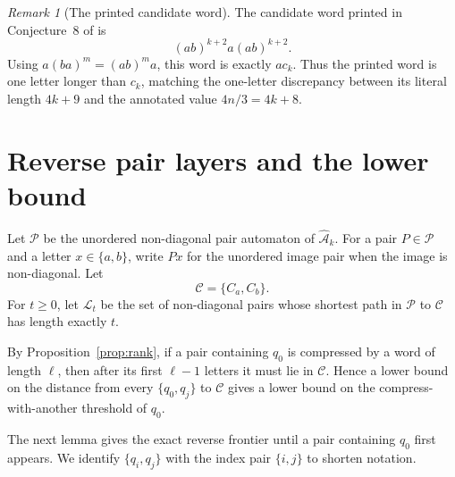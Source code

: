 \documentclass[11pt]{article}
\theoremstyle{definition}
\theoremstyle{remark}
\newtheorem{remark}{Remark}
\newcommand{\Ahat}{\widehat{\mathcal A}}
\newcommand{\pair}[2]{\{q_{#1},q_{#2}\}}
\begin{document}
\begin{remark}[The printed candidate word]
The candidate word printed in Conjecture~8 of \cite{Szykula2026} is
\[
 (ab)^{k+2}a(ab)^{k+2}.
\]
Using $a(ba)^m=(ab)^ma$, this word is exactly $a c_k$. Thus the printed word is one letter longer than $c_k$, matching the one-letter discrepancy between its literal length $4k+9$ and the annotated value $4n/3=4k+8$.
\end{remark}

\section{Reverse pair layers and the lower bound}
Let $\mathcal P$ be the unordered non-diagonal pair automaton of $\Ahat_k$. For a pair $P\in\mathcal P$ and a letter $x\in\{a,b\}$, write $Px$ for the unordered image pair when the image is non-diagonal. Let
\[
 \mathcal C=\{C_a,C_b\}.
\]
For $t\ge0$, let $\mathcal L_t$ be the set of non-diagonal pairs whose shortest path in $\mathcal P$ to $\mathcal C$ has length exactly $t$.

By Proposition~\ref{prop:rank}, if a pair containing $q_0$ is compressed by a word of length $\ell$, then after its first $\ell-1$ letters it must lie in $\mathcal C$. Hence a lower bound on the distance from every $\pair{0}{j}$ to $\mathcal C$ gives a lower bound on the compress-with-another threshold of $q_0$.

The next lemma gives the exact reverse frontier until a pair containing $q_0$ first appears. We identify $\{q_i,q_j\}$ with the index pair $\{i,j\}$ to shorten notation.
\end{document}
